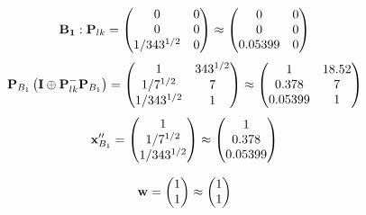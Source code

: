 \documentclass[10pt,a4paper]{article}
\begin{document}
	\[
		\bold{B_1}: \bold{P}_{lk} = 
		\begin{pmatrix}
			{{0}}{} & {{0}}{} \\
			{{0}}{} & {{0}}{} \\
			{1} / {{343^ {1 / 2}}} & {{0}}{} \\
		\end{pmatrix}
		\approx
		\begin{pmatrix}
			0        & 0        \\
			0        & 0        \\
			0.05399  & 0        \\
		\end{pmatrix}
	\]
	\[
		\bold{P}_{B_1}\left(\bold{I} \oplus \bold{P}_{lk}^{-}\bold{P}_{B_1}\right) = 
		\begin{pmatrix}
			{1}{} & {{343^ {1 / 2}}}{} \\
			{1} / {{7^ {1 / 2}}} & {{7}}{} \\
			{1} / {{343^ {1 / 2}}} & {1}{} \\
		\end{pmatrix}
		\approx
		\begin{pmatrix}
			1        & 18.52    \\
			0.378    & 7        \\
			0.05399  & 1        \\
		\end{pmatrix}
	\]
	\[
		\bold{x}''_{B_1} = 
		\begin{pmatrix}
			{1}{} \\
			{1} / {{7^ {1 / 2}}} \\
			{1} / {{343^ {1 / 2}}} \\
		\end{pmatrix}
		\approx
		\begin{pmatrix}
			1        \\
			0.378    \\
			0.05399  \\
		\end{pmatrix}
	\]

	\[
		\bold{w} = 
		\begin{pmatrix}
			{1}{} \\
			{1}{} \\
		\end{pmatrix}
		\approx
		\begin{pmatrix}
			1        \\
			1        \\
		\end{pmatrix}
	\]
\end{document}
